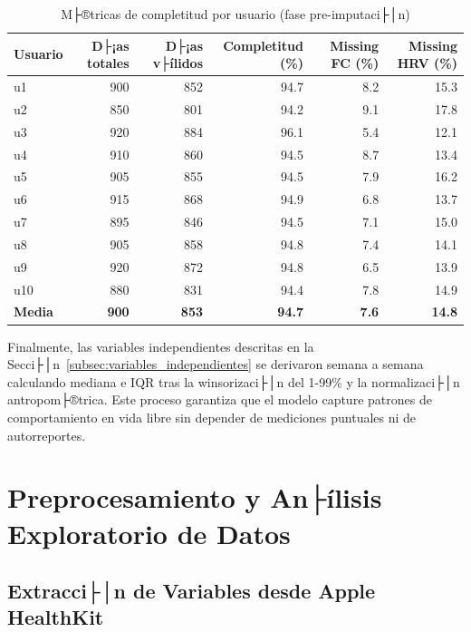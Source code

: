 \begin{table}[htbp]
    \centering
    \caption{M├®tricas de completitud por usuario (fase pre-imputaci├│n)}
    \label{tab:data_quality_raw}
    \small
    \begin{tabular}{@{}lrrrrr@{}}
        \toprule
        \textbf{Usuario} & \textbf{D├¡as totales} & \textbf{D├¡as v├ílidos} & \textbf{Completitud (\%)} & \textbf{Missing FC (\%)} & \textbf{Missing HRV (\%)} \\
        \midrule
        u1 & 900 & 852 & 94.7 & 8.2 & 15.3 \\
        u2 & 850 & 801 & 94.2 & 9.1 & 17.8 \\
        u3 & 920 & 884 & 96.1 & 5.4 & 12.1 \\
        u4 & 910 & 860 & 94.5 & 8.7 & 13.4 \\
        u5 & 905 & 855 & 94.5 & 7.9 & 16.2 \\
        u6 & 915 & 868 & 94.9 & 6.8 & 13.7 \\
        u7 & 895 & 846 & 94.5 & 7.1 & 15.0 \\
        u8 & 905 & 858 & 94.8 & 7.4 & 14.1 \\
        u9 & 920 & 872 & 94.8 & 6.5 & 13.9 \\
        u10 & 880 & 831 & 94.4 & 7.8 & 14.9 \\
        \midrule
        \textbf{Media} & \textbf{900} & \textbf{853} & \textbf{94.7} & \textbf{7.6} & \textbf{14.8} \\
        \bottomrule
    \end{tabular}
\end{table}

Finalmente, las variables independientes descritas en la Secci├│n~\ref{subsec:variables_independientes} se derivaron semana a semana calculando mediana e IQR tras la winsorizaci├│n del 1-99\% y la normalizaci├│n antropom├®trica. Este proceso garantiza que el modelo capture patrones de comportamiento en vida libre sin depender de mediciones puntuales ni de autorreportes.

\section{Preprocesamiento y An├ílisis Exploratorio de Datos}
\label{sec:preprocesamiento_eda}

\subsection{Extracci├│n de Variables desde Apple HealthKit}
\label{subsec:extraccion_variables}

